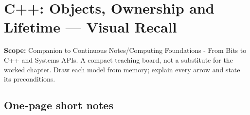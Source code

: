 \hypertarget{appendix-960160274237}{}\label{referencestart:appendix-960160274237}
\section{C++: Objects, Ownership and Lifetime --- Visual Recall}\label{appendix-960160274237-c-objects-ownership-and-lifetime-visual-recall}

\textbf{Scope:} Companion to {Continuous Notes/Computing Foundations - From Bits to C++ and Systems APIs}. A compact teaching board, not a substitute for the worked chapter. Draw each model from memory; explain every arrow and state its preconditions.

\subsection{One-page short notes}\label{appendix-960160274237-one-page-short-notes}

